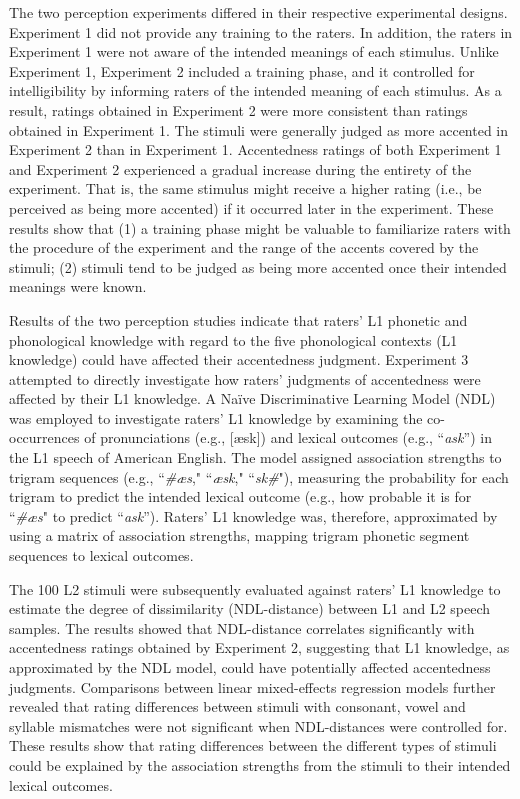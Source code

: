 The two perception experiments differed in their respective experimental designs. Experiment 1 did not provide any training to the raters. In addition, the raters in Experiment 1 were not aware of the intended meanings of each stimulus. Unlike Experiment 1, Experiment 2 included a training phase, and it controlled for intelligibility by informing raters of the intended meaning of each stimulus. As a result, ratings obtained in Experiment 2 were more consistent than ratings obtained in Experiment 1. The stimuli were generally judged as more accented in Experiment 2 than in Experiment 1. Accentedness ratings of both Experiment 1 and Experiment 2 experienced a gradual increase during the entirety of the experiment. That is, the same stimulus might receive a higher rating (i.e., be perceived as being more accented) if it occurred later in the experiment. These results show that (1) a training phase might be valuable to familiarize raters with the procedure of the experiment and the range of the accents covered by the stimuli; (2) stimuli tend to be judged as being more accented once their intended meanings were known.

Results of the two perception studies indicate that raters’ L1 phonetic and phonological knowledge with regard to the five phonological contexts (L1 knowledge) could have affected their accentedness judgment. Experiment 3 attempted to directly investigate how raters’ judgments of accentedness were affected by their L1 knowledge. A Naïve Discriminative Learning Model (NDL) was employed to investigate raters’ L1 knowledge by examining the co-occurrences of pronunciations (e.g., [æsk]) and lexical outcomes (e.g., “\textit{ask}”) in the L1 speech of American English. The model assigned association strengths to trigram sequences (e.g., ``\textit{\#æs}," ``\textit{æsk}," ``\textit{sk\#}"), measuring the probability for each trigram to predict the intended lexical outcome (e.g., how probable it is for ``\textit{\#æs}" to predict “\textit{ask}”). Raters’ L1 knowledge was, therefore, approximated by using a matrix of association strengths, mapping trigram phonetic segment sequences to lexical outcomes.

The 100 L2 stimuli were subsequently evaluated against raters’ L1 knowledge to estimate the degree of dissimilarity (NDL-distance) between L1 and L2 speech samples. The results showed that NDL-distance correlates significantly with accentedness ratings obtained by Experiment 2, suggesting that L1 knowledge, as approximated by the NDL model, could have potentially affected accentedness judgments. Comparisons between linear mixed-effects regression models further revealed that rating differences between stimuli with consonant, vowel and syllable mismatches were not significant when NDL-distances were controlled for. These results show that rating differences between the different types of stimuli could be explained by the  association strengths from the stimuli to their intended lexical outcomes.

